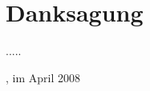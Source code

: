 
\chapter*{Danksagung}

.....

\vspace{1.5cm}

\begin{center}
\raggedleft{\campusAuthor}
\end{center}

\vspace{1.5cm}

\campusCity, im April 2008
